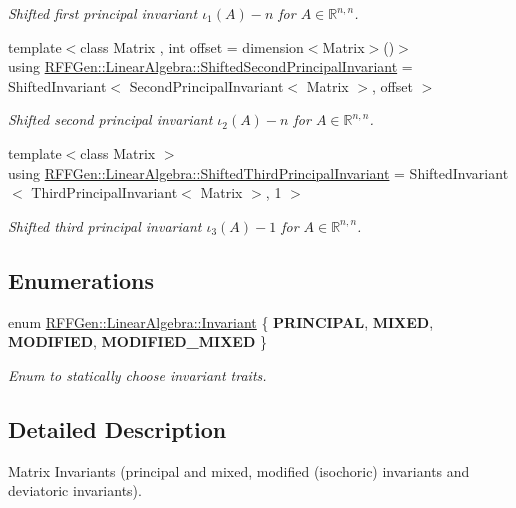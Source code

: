 \begin{DoxyCompactItemize}
\begin{DoxyCompactList}\small\item\em Shifted first principal invariant $ \iota_1(A) - n $ for $ A\in\mathbb{R}^{n,n} $. \end{DoxyCompactList}\item 
\hypertarget{group__InvariantGroup_ga8b827036929c8a747d0e901cdddf2f70}{{\footnotesize template$<$class Matrix , int offset = dimension$<$\-Matrix$>$()$>$ }\\using \hyperlink{group__InvariantGroup_ga8b827036929c8a747d0e901cdddf2f70}{R\-F\-F\-Gen\-::\-Linear\-Algebra\-::\-Shifted\-Second\-Principal\-Invariant} = Shifted\-Invariant$<$ Second\-Principal\-Invariant$<$ Matrix $>$, offset $>$}\label{group__InvariantGroup_ga8b827036929c8a747d0e901cdddf2f70}

\begin{DoxyCompactList}\small\item\em Shifted second principal invariant $ \iota_2(A) - n $ for $ A\in\mathbb{R}^{n,n} $. \end{DoxyCompactList}\item 
\hypertarget{group__InvariantGroup_gaa3670564453075521adb81bee7fa45e7}{{\footnotesize template$<$class Matrix $>$ }\\using \hyperlink{group__InvariantGroup_gaa3670564453075521adb81bee7fa45e7}{R\-F\-F\-Gen\-::\-Linear\-Algebra\-::\-Shifted\-Third\-Principal\-Invariant} = Shifted\-Invariant$<$ Third\-Principal\-Invariant$<$ Matrix $>$, 1 $>$}\label{group__InvariantGroup_gaa3670564453075521adb81bee7fa45e7}

\begin{DoxyCompactList}\small\item\em Shifted third principal invariant $ \iota_3(A) - 1 $ for $ A\in\mathbb{R}^{n,n} $. \end{DoxyCompactList}\end{DoxyCompactItemize}
\subsection*{Enumerations}
\begin{DoxyCompactItemize}
\item 
enum \hyperlink{group__InvariantGroup_gaddcbe266c25a46f729eb8b89841467d9}{R\-F\-F\-Gen\-::\-Linear\-Algebra\-::\-Invariant} \{ {\bfseries P\-R\-I\-N\-C\-I\-P\-A\-L}, 
{\bfseries M\-I\-X\-E\-D}, 
{\bfseries M\-O\-D\-I\-F\-I\-E\-D}, 
{\bfseries M\-O\-D\-I\-F\-I\-E\-D\-\_\-\-M\-I\-X\-E\-D}
 \}
\begin{DoxyCompactList}\small\item\em Enum to statically choose invariant traits. \end{DoxyCompactList}\end{DoxyCompactItemize}


\subsection{Detailed Description}
Matrix Invariants (principal and mixed, modified (isochoric) invariants and deviatoric invariants). 